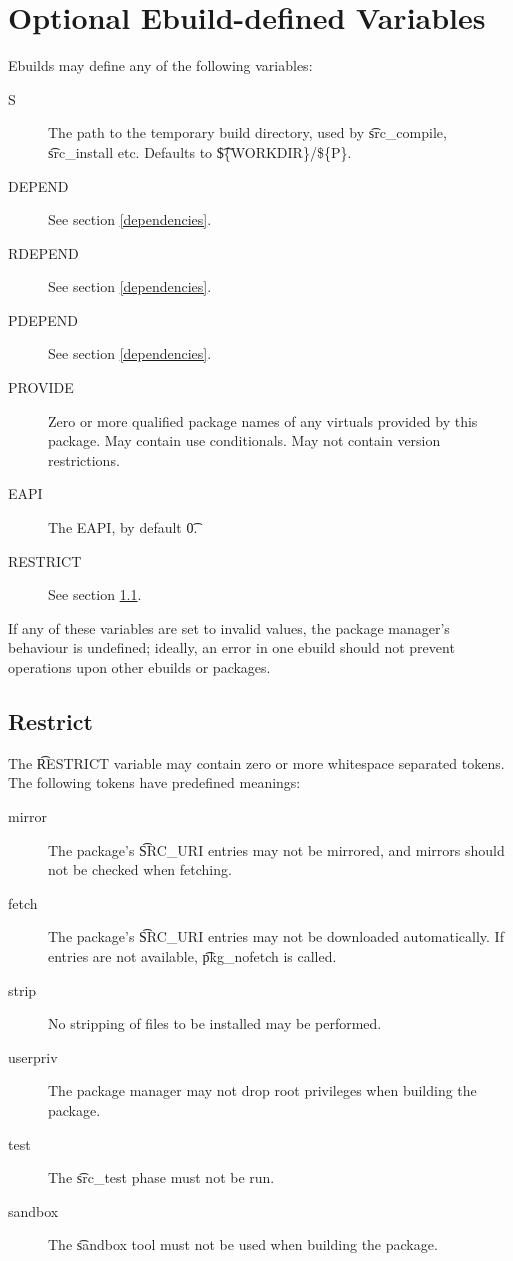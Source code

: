 \section{Optional Ebuild-defined Variables}

Ebuilds may define any of the following variables:

\begin{description}
\item[S] The path to the temporary build directory, used by \t{src\_compile}, \t{src\_install}
    etc. Defaults to \t{\$\{WORKDIR\}/\$\{P\}}.
\item[DEPEND] See section \ref{dependencies}.
\item[RDEPEND] See section \ref{dependencies}.
\item[PDEPEND] See section \ref{dependencies}.
\item[PROVIDE] Zero or more qualified package names of any 
    virtuals provided by this package. May contain use conditionals. May not contain version
    restrictions. \label{ebuild-var-provide}
\item[EAPI] The EAPI, by default \t{0}.
\item[RESTRICT] See section \ref{restrict}.
\end{description}

If any of these variables are set to invalid values, the package manager's behaviour is undefined;
ideally, an error in one ebuild should not prevent operations upon other ebuilds or packages.

\subsection{Restrict}
\label{restrict}

The \t{RESTRICT} variable may contain zero or more whitespace separated tokens. The following
tokens have predefined meanings:

\begin{description}
\item[mirror] The package's \t{SRC\_URI} entries may not be mirrored, and mirrors should not
    be checked when fetching.
\item[fetch] The package's \t{SRC\_URI} entries may not be downloaded automatically. If
    entries are not available, \t{pkg\_nofetch} is called.
\item[strip] No stripping of files to be installed may be performed.
\item[userpriv] The package manager may not drop root privileges when building the package.
\item[test] The \t{src\_test} phase must not be run.
\item[sandbox] The \t{sandbox} tool must not be used when building the package.
\end{description}

